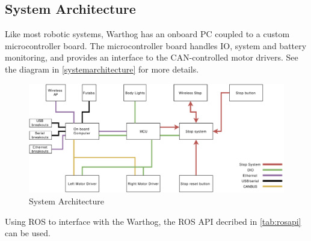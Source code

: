 \documentclass[]{clearpath-latex/clearpath-manual}
\begin{document}
\subsection{System Architecture}

Like most robotic systems, Warthog has an onboard PC coupled to a custom microcontroller board. The microcontroller board handles IO, system and battery monitoring, and provides an interface to the CAN-controlled motor drivers. See the diagram in \autoref{systemarchitecture} for more details.

\begin{figure}[!htb]
  \centering
  \includegraphics[width=1.0\linewidth]{warthog-logic-conn.pdf}
  \caption{System Architecture}
  \label{systemarchitecture}
\end{figure}

Using ROS to interface with the Warthog, the ROS API decribed in \autoref{tab:rosapi} can be used.
\end{document}
